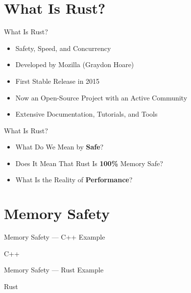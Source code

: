 \documentclass[10pt]{beamer}
\begin{document}
\section{What Is Rust?}

\begin{frame}{What Is Rust?}
    \begin{itemize}
        \item Safety, Speed, and Concurrency
        \item Developed by Mozilla (Graydon Hoare)
        \item First Stable Release in 2015
        \item Now an Open-Source Project with an Active Community
        \item Extensive Documentation, Tutorials, and Tools
    \end{itemize}
\end{frame}

\begin{frame}{What Is Rust?}

\begin{itemize}
    \setlength\itemsep{4em}
    \item[] {\Large What Do We Mean by \textbf{Safe}?}
    \pause
    \item[]  {\Large Does It Mean That Rust Is \textbf{100\%} Memory Safe?}
    \pause
    \item[] {\Large What Is the Reality of \textbf{Performance}?}
\end{itemize}
\end{frame}

\section{Memory Safety}

\begin{frame}{Memory Safety --- C++ Example}
    \begin{block}{C++}        
        
    \end{block}
\end{frame}

\begin{frame}{Memory Safety --- Rust Example}
    
    \begin{block}{Rust}        
        
    \end{block}
\end{frame}
\end{document}
